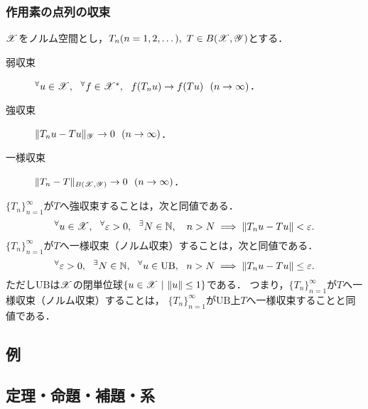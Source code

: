     \subsubsection{作用素の点列の収束}
    $\mathscr{X}$をノルム空間とし，$T_n (n=1,2,\dots),~ T \in B(\mathscr{X}, \mathscr{Y})$とする．
    \begin{description}
        \item[弱収束]\hspace{0.6em} ${}^{\forall} u \in \mathscr{X},~~ {}^{\forall} f \in \mathscr{X}^*,~~ f(T_n u) \to f(T u) ~~ (n \to \infty)$．
        \item[強収束]\hspace{0.6em} $\|T_n u-T u\|_{\mathscr{Y}} \to 0 ~~ (n \to \infty)$．
        \item[一様収束] $\|T_n-T\|_{B(\mathscr{X}, \mathscr{Y})} \to 0 ~~ (n \to \infty)$．
    \end{description}
    $\{T_n\}_{n=1}^{\infty}$が$T$へ強収束することは，次と同値である．
    \[ {}^{\forall} u \in \mathscr{X},~~ {}^{\forall} \varepsilon>0,~~ {}^{\exists} N \in \mathbb{N},~~~ n>N \implies \| T_n u-T u \| < \varepsilon. \]
    $\{T_n\}_{n=1}^{\infty}$が$T$へ一様収束（ノルム収束）することは，次と同値である．
    \[ {}^{\forall} \varepsilon>0,~~ {}^{\exists} N \in \mathbb{N},~~ {}^{\forall} u \in \mathrm{UB},~~ n>N \implies \| T_n u-T u \| \leq \varepsilon. \]
    ただし$\mathrm{UB}$は$\mathscr{X}$の閉単位球$\{u \in \mathscr{X} ~|~ \|u\| \leq 1\}$である．
    つまり，$\{T_n\}_{n=1}^{\infty}$が$T$へ一様収束（ノルム収束）することは，
    $\{T_n\}_{n=1}^{\infty}$が$\mathrm{UB}$上$T$へ一様収束することと同値である．

    \subsection{例}
    \subsection{定理・命題・補題・系}
